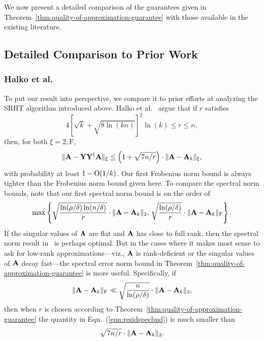 We now present a detailed comparison of the guarantees given in Theorem~\ref{thm:quality-of-approximation-guarantee} with those available in the existing literature. %

\subsection{Detailed Comparison to Prior Work}
\label{sec:priorwork}

\subsubsection{Halko et al.~\cite{HMT}}
To put our result into perspective, we compare it to prior efforts at analyzing the SRHT algorithm introduced above.
Halko et al.~\cite{HMT} argue that if $r$ satisfies
\begin{equation}\label{rhmt}
4 \left[\sqrt{k} + \sqrt{8\ln(kn)} \right]^2 \ln(k) \leq r \leq n,
\end{equation}
then, for both $\xi=2,\mathrm{F}$,
$$ \mbox{}\|{\bm{\mathrm{A}}} - {\bm{\mathrm{Y}}} {{\bm{\mathrm{Y}}}}^\dagger {\ensuremath{\bm{\mathrm{A}}}}\|_{\xi} \le \left( 1 + \sqrt{7n/r} \right) \cdot \mbox{}\|{\bm{\mathrm{A}}} - {\bm{\mathrm{A}}}_k\|_{\xi},$$
with probability at least $1 - \mathrm{O}(1/k)$. Our first Frobenius norm bound is always tighter than the Frobenius norm bound given here.
To compare the spectral norm bounds, note that our first spectral norm bound is on the order of
\begin{equation}
\label{eqn:residspecbnd}
 \max\left\{\sqrt{\frac{ \ln(\rho/\delta) \ln(n/\delta)}{r} } \cdot \TNorm{\matA - \matA_k},\,  \sqrt{ \frac{ \ln(\rho/\delta) }{ r } } \cdot \FNorm{\matA - \matA_k}\right\}.
\end{equation}
If the singular values of ${\bm{\mathrm{A}}}$ are flat and ${\bm{\mathrm{A}}}$ has close to full rank, then the spectral norm result in~\cite{HMT} is perhaps optimal. But in the cases where it makes most sense to ask for low-rank approximations---viz., ${\bm{\mathrm{A}}}$ is rank-deficient or the singular values of ${\bm{\mathrm{A}}}$
decay fast---the spectral error norm bound in Theorem~\ref{thm:quality-of-approximation-guarantee} is more useful. Specifically, if
$$ \mbox{}\|{\bm{\mathrm{A}}} - {\bm{\mathrm{A}}}_k\|_\mathrm{F} \ll \sqrt{ {n\over  \ln(\rho/\delta) } } \cdot \mbox{}\|{\bm{\mathrm{A}}} - {\bm{\mathrm{A}}}_k\|_2,$$
then when $r$ is chosen according to Theorem~\ref{thm:quality-of-approximation-guarantee} the quantity in Eqn.~(\ref{eqn:residspecbnd}) is much smaller than $$\sqrt{7 n/r} \cdot \mbox{}\|{\bm{\mathrm{A}}} - {\bm{\mathrm{A}}}_k\|_2.$$

